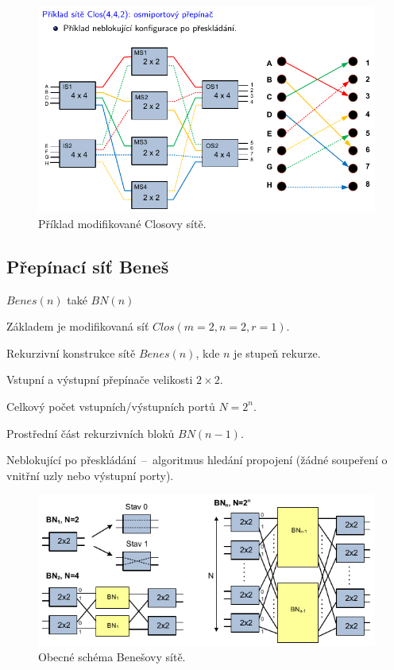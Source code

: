 \begin{figure}[H]
    \centering
    \includegraphics[width=1\linewidth]{clos_modifikovany_priklad.pdf}
    \caption{Příklad modifikované Closovy sítě.}
\end{figure}

\subsection{Přepínací síť Beneš}

$Benes(n)$ také $BN(n)$
\begin{compactitem}
    \item Základem je modifikovaná síť $Clos(m=2, n=2, r=1)$.
    \item Rekurzivní konstrukce sítě $Benes(n)$, kde $n$ je stupeň rekurze.
    \item Vstupní a výstupní přepínače velikosti $2 \times 2$.
    \item Celkový počet vstupních/výstupních portů $N = 2^n$.
    \item Prostřední část rekurzivních bloků $BN(n-1)$.
    \item Neblokující po přeskládání~--~algoritmus hledání propojení (žádné soupeření o vnitřní uzly nebo výstupní porty).
\end{compactitem}

\begin{figure}[H]
    \centering
    \includegraphics[width=0.9\linewidth]{benes.pdf}
    \caption{Obecné schéma Benešovy sítě.}
\end{figure}

